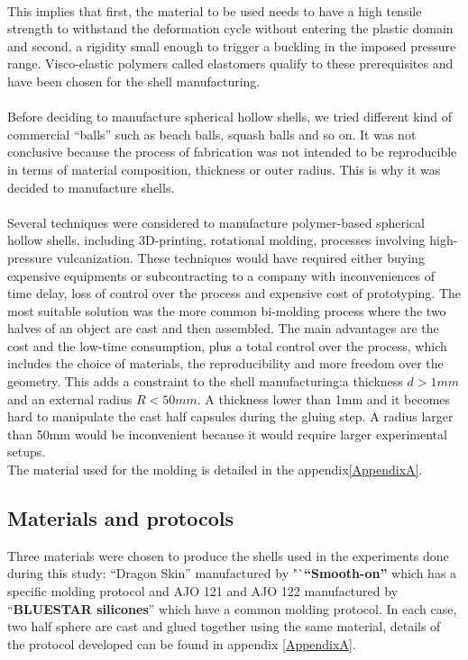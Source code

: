 \paragraph{}
This implies that first, the material to be used needs to have a high tensile strength to withstand the deformation cycle without entering the plastic domain and second, a rigidity small enough to trigger a buckling in the imposed pressure range. Visco-elastic polymers called elastomers qualify to these prerequisites and have been chosen for the shell manufacturing.
\paragraph{}
Before deciding to manufacture spherical hollow shells, we tried different kind of commercial "`balls"' such as beach balls, squash balls and so on. It was not conclusive because the process of fabrication was not intended to be reproducible in terms of material composition, thickness or outer radius. This is why it was decided to manufacture shells.
\paragraph{}
Several techniques were considered to manufacture polymer-based spherical hollow shells, including 3D-printing, rotational molding, processes involving high-pressure vulcanization. These techniques would have required either buying expensive equipments or subcontracting to a company with inconveniences of time delay, loss of control over the process and expensive cost of prototyping. 
The most suitable solution was the more common bi-molding process where the two halves of an object are cast and then assembled. The main advantages are the cost and the low-time consumption, plus a total control over the process, which includes the choice of materials, the reproducibility and more freedom over the geometry.
This adds a constraint to the shell manufacturing:a thickness $d > 1 mm$ and an external radius $R < 50 mm$. A thickness lower than 1mm and it becomes hard to manipulate the cast half capsules during the gluing step. A radius larger than 50mm would be inconvenient because it would require larger experimental setups.\\
The material used for the molding is detailed in the appendix\ref{AppendixA}.

\newpage
\subsection{Materials and protocols}
Three materials were chosen to produce the shells used in the experiments done during this study: "`Dragon Skin"' manufactured by "`\textbf{"`Smooth-on\textcopyright"'} which has a specific molding protocol and AJO 121 and AJO 122 manufactured by "`\textbf{BLUESTAR silicones\textcopyright}"' which have a common molding protocol. In each case, two half sphere are cast and glued together using the same material, details of the protocol developed can be found in appendix \ref{AppendixA}.

